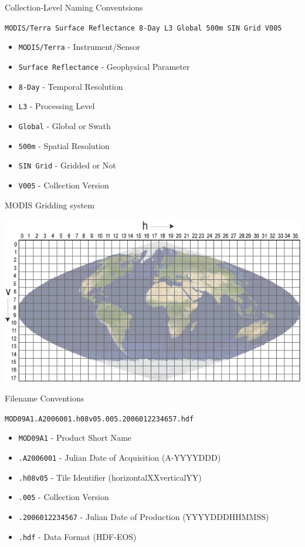 \documentclass[ignorenonframetext,]{beamer}
\begin{document}
\begin{frame}{Collection-Level Naming Conventsions}

\texttt{MODIS/Terra Surface Reflectance 8-Day L3 Global 500m SIN Grid V005}

\begin{itemize}
\itemsep1pt\parskip0pt
\item
  \texttt{MODIS/Terra} - Instrument/Sensor
\item
  \texttt{Surface Reflectance} - Geophysical Parameter
\item
  \texttt{8-Day} - Temporal Resolution
\item
  \texttt{L3} - Processing Level
\item
  \texttt{Global} - Global or Swath
\item
  \texttt{500m} - Spatial Resolution
\item
  \texttt{SIN Grid} - Gridded or Not
\item
  \texttt{V005} - Collection Version
\end{itemize}

\end{frame}

\begin{frame}{MODIS Gridding system}

\includegraphics{assets/modgrid.gif}

\end{frame}

\begin{frame}{Filename Conventions}

\texttt{MOD09A1.A2006001.h08v05.005.2006012234657.hdf}

\begin{itemize}
\itemsep1pt\parskip0pt
\item
  \texttt{MOD09A1} - Product Short Name
\item
  \texttt{.A2006001} - Julian Date of Acquisition (A-YYYYDDD)
\item
  \texttt{.h08v05} - Tile Identifier (horizontalXXverticalYY)
\item
  \texttt{.005} - Collection Version
\item
  \texttt{.2006012234567} - Julian Date of Production (YYYYDDDHHMMSS)
\item
  \texttt{.hdf} - Data Format (HDF-EOS)
\end{itemize}

\end{frame}
\end{document}
